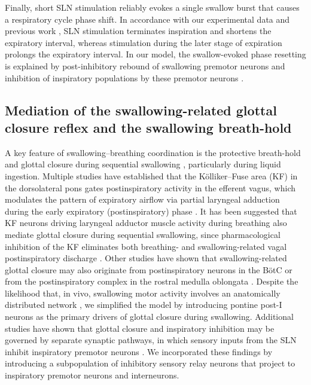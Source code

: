 \documentclass[pdflatex,sn-mathphys-ay]{sn-jnl}%
\theoremstyle{thmstyleone}%
\theoremstyle{thmstyletwo}%
\theoremstyle{thmstylethree}%
\begin{document}
Finally, short SLN stimulation reliably evokes a single swallow burst that causes a respiratory cycle phase shift. In accordance with our experimental data and previous work \citep{oku1992phase}, SLN stimulation terminates inspiration and shortens the expiratory interval, whereas stimulation during the later stage of expiration prolongs the expiratory interval. In our model, the swallow-evoked phase resetting is explained by post-inhibitory rebound of swallowing premotor neurons and inhibition of inspiratory populations by these premotor neurons \citep{horton2018central, saito2002swallowing, saito2003activity}.

\subsection{Mediation of the swallowing-related glottal closure reflex and the swallowing breath-hold}
A key feature of swallowing–breathing coordination is the protective breath-hold and glottal closure during sequential swallowing \citep{harding1984perinatal, bautista2014generation, dutschmann2014physiological, pitts2023deglutition, sun2011temporal}, particularly during liquid ingestion. Multiple studies have established that the Kölliker–Fuse area (KF) in the dorsolateral pons gates postinspiratory activity in the efferent vagus, which modulates the pattern of expiratory airflow via partial laryngeal adduction during the early expiratory (postinspiratory) phase \citep{dutschmann2014physiological, browaldh2016kolliker}. It has been suggested that KF neurons driving laryngeal adductor muscle activity during breathing also mediate glottal closure during sequential swallowing, since pharmacological inhibition of the KF eliminates both breathing- and swallowing-related vagal postinspiratory discharge \citep{bautista2014ponto}. Other studies have shown that swallowing-related glottal closure may also originate from postinspiratory neurons in the BötC \citep{sun2011temporal} or from the postinspiratory complex in the rostral medulla oblongata \citep{toor2019neurons, huff2023role}.
Despite the likelihood that, in vivo, swallowing motor activity involves an anatomically distributed network \citep{jean2001brain, sugiyama2011axonal, sun2011temporal, bautista2014ponto}, we simplified the model by introducing pontine post-I neurons as the primary drivers of glottal closure during swallowing. Additional studies have shown that glottal closure and inspiratory inhibition may be governed by separate synaptic pathways, in which sensory inputs from the SLN inhibit inspiratory premotor neurons \citep{hiss2003swallowing, bautista2014generation, sun2011temporal}. We incorporated these findings by introducing a subpopulation of inhibitory sensory relay neurons that project to inspiratory premotor neurons and interneurons.
\end{document}
